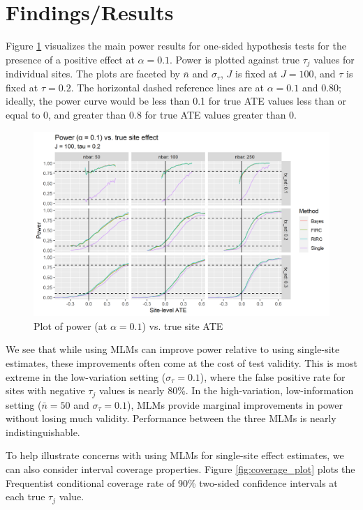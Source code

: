 \documentclass[]{article}
\begin{document}
\section{Findings/Results}

Figure \ref{fig:power_plot} visualizes the main power results for one-sided hypothesis tests for the presence of a positive effect at $\alpha=0.1$.
Power is plotted against true $\tau_j$ values for individual sites.
The plots are faceted by $\bar{n}$ and $\sigma_\tau$, $J$ is fixed at $J=100$, and $\tau$ is fixed at $\tau=0.2$.
The horizontal dashed reference lines are at $\alpha = 0.1$ and $0.80$; ideally, the power curve would be less than 0.1 for true ATE values less than or equal to 0, and greater than 0.8 for true ATE values greater than 0.

\begin{figure}[ht]
	\centering
	\includegraphics[width=\textwidth]{power_plot_J100}
	\caption{Plot of power (at $\alpha = 0.1$) vs. true site ATE}
	\label{fig:power_plot}
\end{figure}

We see that while using MLMs can improve power relative to using single-site estimates, these improvements often come at the cost of test validity.
This is most extreme in the low-variation setting ($\sigma_\tau = 0.1$), where the false positive rate for sites with negative $\tau_j$ values is nearly 80\%.
In the high-variation, low-information setting ($\bar{n}=50$ and $\sigma_\tau = 0.1$), MLMs provide marginal improvements in power without losing much validity.
Performance between the three MLMs is nearly indistinguishable.

To help illustrate concerns with using MLMs for single-site effect estimates, we can also consider interval coverage properties.
Figure \ref{fig:coverage_plot} plots the Frequentist conditional coverage rate of 90\% two-sided confidence intervals at each true $\tau_j$ value.
\end{document}
